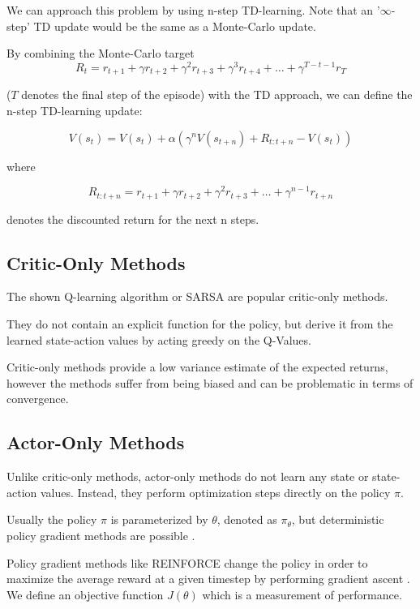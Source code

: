 We can approach this problem by using n-step TD-learning.
Note that an '$ \infty $-step' TD update would be the same as a Monte-Carlo update.

By combining the Monte-Carlo target
\begin{equation}
R_t = r_{t+1}+\gamma r_{t+2}+\gamma^2 r_{t+3}+\gamma^3 r_{t+4}+ \dots +\gamma^{T-t-1} r_{T}
\end{equation}

 ($T$ denotes the final step of the episode) with the TD approach, we can define the n-step TD-learning update:
 
\begin{equation}
V(s_t) = V(s_t) + \alpha(\gamma^nV(s_{t+n})+R_{t:t+n} - V(s_t))
\end{equation} 

where 

\begin{equation}
R_{t:t+n} = r_{t+1}+\gamma r_{t+2}+\gamma^2 r_{t+3}+ \dots +\gamma^{n-1} r_{t+n}
\end{equation}

denotes the discounted return for the next n steps.
\subsection{Critic-Only Methods}

The shown Q-learning algorithm or SARSA are popular critic-only methods.

They do not contain an explicit function for the policy, but derive it from the learned state-action values by acting greedy on the Q-Values.

Critic-only methods provide a low variance estimate of the expected returns, however the methods suffer from being biased and can be problematic in terms of convergence.

\subsection{Actor-Only Methods}

Unlike critic-only methods, actor-only methods do not learn any state or state-action values.
Instead, they perform optimization steps directly on the policy $\pi$.

Usually the policy $\pi$ is parameterized by $\theta$, denoted as $\pi_\theta$, but deterministic policy gradient methods are possible \citep{DDPG}. 

Policy gradient methods like REINFORCE change the policy in order to maximize the average reward at a given timestep by performing gradient ascent \citep{Williams1992}. 
We define an objective function $J(\theta)$ which is a measurement of performance.

